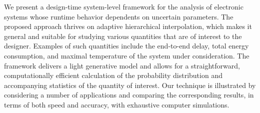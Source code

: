 We present a design-time system-level framework for the analysis of electronic
systems whose runtime behavior dependents on uncertain parameters. The proposed
approach thrives on adaptive hierarchical interpolation, which makes it general
and suitable for studying various quantities that are of interest to the
designer. Examples of such quantities include the end-to-end delay, total energy
consumption, and maximal temperature of the system under consideration. The
framework delivers a light generative model and allows for a straightforward,
computationally efficient calculation of the probability distribution and
accompanying statistics of the quantity of interest. Our technique is
illustrated by considering a number of applications and comparing the
corresponding results, in terms of both speed and accuracy, with exhaustive
computer simulations.
